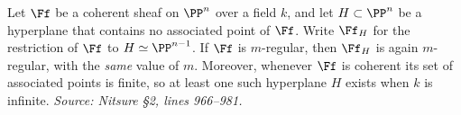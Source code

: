 \begin{lemma}
  \label{lem:regularity-hyperplane-restriction}
  Let $\Ff$ be a coherent sheaf on $\PP^n$ over a field $k$, and let
  $H\subset\PP^n$ be a hyperplane that contains no associated point of $\Ff$.
  Write $\Ff_H$ for the restriction of $\Ff$ to $H\simeq\PP^{n-1}$. If $\Ff$ is
  $m$-regular, then $\Ff_H$ is again $m$-regular, with the \emph{same} value of
  $m$. Moreover, whenever $\Ff$ is coherent its set of associated points is
  finite, so at least one such hyperplane $H$ exists when $k$ is infinite.
  \textit{Source: Nitsure \S2, lines 966--981.}
\end{lemma}

